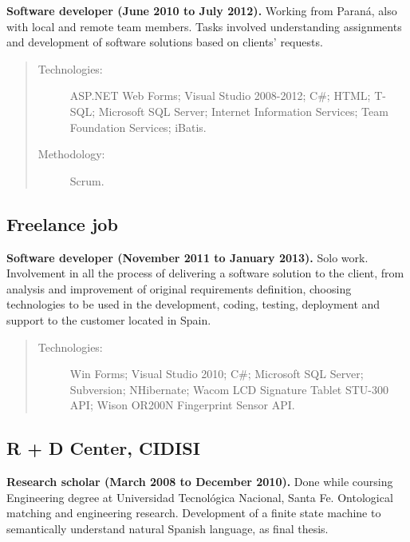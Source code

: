 \textbf{Software developer (June 2010 to July 2012).} Working from Paraná, also with local and remote team members. Tasks involved understanding assignments and development of software solutions based on clients' requests.

\begin{quote}
\begin{description}
    \item[Technologies:] ASP.NET Web Forms; Visual Studio 2008-2012; C\#; HTML; T-SQL; Microsoft SQL Server; Internet Information Services; Team Foundation Services; iBatis.
    \item[Methodology:] Scrum.
\end{description}
\end{quote}

\subsection*{Freelance job}

\textbf{Software developer (November 2011 to January 2013).} Solo work. Involvement in all the process of delivering a software solution to the client, from analysis and improvement of original requirements definition, choosing technologies to be used in the development, coding, testing, deployment and support to the customer located in Spain.

\begin{quote}
\begin{description}
    \item[Technologies:] Win Forms; Visual Studio 2010; C\#; Microsoft SQL Server; Subversion; NHibernate; Wacom LCD Signature Tablet STU-300 API; Wison OR200N Fingerprint Sensor API.
\end{description}
\end{quote}

\subsection*{R + D Center, CIDISI}

\textbf{Research scholar (March 2008 to December 2010).} Done while coursing Engineering degree at Universidad Tecnológica Nacional, Santa Fe. Ontological matching and engineering research. Development of a finite state machine to semantically understand natural Spanish language, as final thesis.

